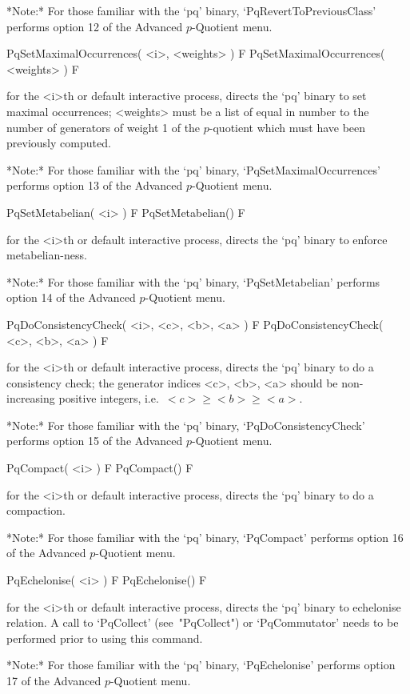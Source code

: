 *Note:*
For  those  familiar  with  the  `pq'  binary,  `PqRevertToPreviousClass'
performs option 12 of the Advanced $p$-Quotient menu.

\>PqSetMaximalOccurrences( <i>, <weights> ) F
\>PqSetMaximalOccurrences( <weights> ) F

for the <i>th or default interactive {\ANUPQ} process, directs  the  `pq'
binary to set maximal occurrences; <weights> must be a list of  equal  in
number to the number of generators of weight 1 of the $p$-quotient  which
must have been previously computed.

*Note:* 
For  those  familiar  with  the  `pq'  binary,  `PqSetMaximalOccurrences'
performs option 13 of the Advanced $p$-Quotient menu.

\>PqSetMetabelian( <i> ) F
\>PqSetMetabelian() F

for the <i>th or default interactive {\ANUPQ} process, directs  the  `pq'
binary to enforce metabelian-ness.

*Note:* 
For those familiar  with  the  `pq'  binary,  `PqSetMetabelian'  performs
option 14 of the Advanced $p$-Quotient menu.

\>PqDoConsistencyCheck( <i>, <c>, <b>, <a> ) F
\>PqDoConsistencyCheck( <c>, <b>, <a> ) F

for the <i>th or default interactive {\ANUPQ} process, directs  the  `pq'
binary to do a consistency check; the generator  indices  <c>,  <b>,  <a>
should be non-increasing positive integers, i.e.~$<c> \ge <b> \ge <a>$.

*Note:*
For those familiar with the `pq' binary, `PqDoConsistencyCheck'  performs
option 15 of the Advanced $p$-Quotient menu.

\>PqCompact( <i> ) F
\>PqCompact() F

for the <i>th or default interactive {\ANUPQ} process, directs  the  `pq'
binary to do a compaction.

*Note:*
For those familiar with the `pq' binary, `PqCompact' performs  option  16
of the Advanced $p$-Quotient menu.

\>PqEchelonise( <i> ) F
\>PqEchelonise() F

for the <i>th or default interactive {\ANUPQ} process, directs  the  `pq'
binary to echelonise relation. A call to `PqCollect' (see~"PqCollect") or
`PqCommutator' needs to be performed prior to using this command.

*Note:*
For those familiar with the `pq' binary, `PqEchelonise'  performs  option
17 of the Advanced $p$-Quotient menu.

